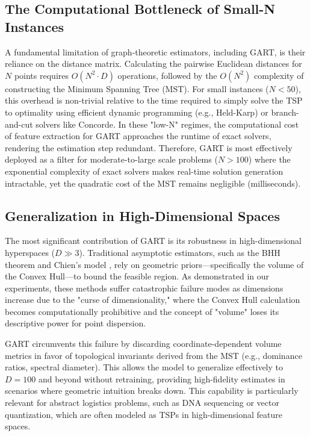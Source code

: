 \documentclass{article}
\begin{document}
\subsection{The Computational Bottleneck of Small-N Instances}
A fundamental limitation of graph-theoretic estimators, including GART, is their reliance on the distance matrix. Calculating the pairwise Euclidean distances for $N$ points requires $O(N^2 \cdot D)$ operations, followed by the $O(N^2)$ complexity of constructing the Minimum Spanning Tree (MST). For small instances ($N < 50$), this overhead is non-trivial relative to the time required to simply solve the TSP to optimality using efficient dynamic programming (e.g., Held-Karp) or branch-and-cut solvers like Concorde. In these "low-N" regimes, the computational cost of feature extraction for GART approaches the runtime of exact solvers, rendering the estimation step redundant. Therefore, GART is most effectively deployed as a filter for moderate-to-large scale problems ($N > 100$) where the exponential complexity of exact solvers makes real-time solution generation intractable, yet the quadratic cost of the MST remains negligible (milliseconds).

\subsection{Generalization in High-Dimensional Spaces}
The most significant contribution of GART is its robustness in high-dimensional hyperspaces ($D \gg 3$). Traditional asymptotic estimators, such as the BHH theorem \citep{bhh1959} and Chien's model \citep{chien1992operational}, rely on geometric priors—specifically the volume of the Convex Hull—to bound the feasible region. As demonstrated in our experiments, these methods suffer catastrophic failure modes as dimensions increase due to the "curse of dimensionality," where the Convex Hull calculation becomes computationally prohibitive and the concept of "volume" loses its descriptive power for point dispersion. 

GART circumvents this failure by discarding coordinate-dependent volume metrics in favor of topological invariants derived from the MST (e.g., dominance ratios, spectral diameter). This allows the model to generalize effectively to $D=100$ and beyond without retraining, providing high-fidelity estimates in scenarios where geometric intuition breaks down. This capability is particularly relevant for abstract logistics problems, such as DNA sequencing or vector quantization, which are often modeled as TSPs in high-dimensional feature spaces.
\end{document}
